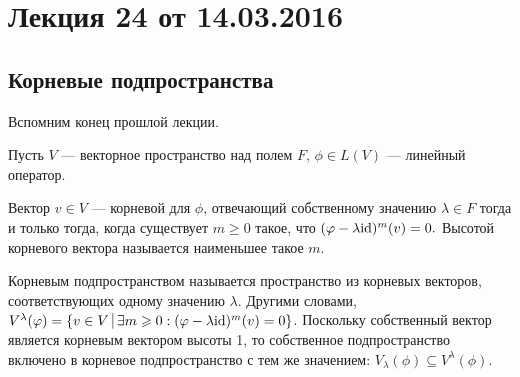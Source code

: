 


\section{Лекция 24 от 14.03.2016}

\subsection*{Корневые подпространства}

Вспомним конец прошлой лекции.

Пусть $V$ --- векторное пространство над полем $F$, $\phi \in L(V)$ --- линейный оператор.

Вектор $v \in V$ --- корневой для $\phi$, отвечающий собственному значению $\lambda \in F$ тогда и только тогда, когда существует $m \geqslant 0 $ такое, что $(\varphi - \lambda \mathrm{id})^{m}(v) = 0.$ Высотой корневого вектора называется наименьшее такое $m$.

Корневым подпространством называется пространство из корневых векторов, соответствующих одному значению $\lambda$. Другими словами, $V^{\lambda}(\phi) = \{v \in V \; \vline \; \exists m \geqslant 0 : (\phi - \lambda \id)^{m}(v) = 0\}$. Поскольку собственный вектор является корневым вектором высоты 1, то собственное подпространство включено в корневое подпространство с тем же значением: $V_{\lambda}(\phi) \subseteq V^{\lambda}(\phi).$

